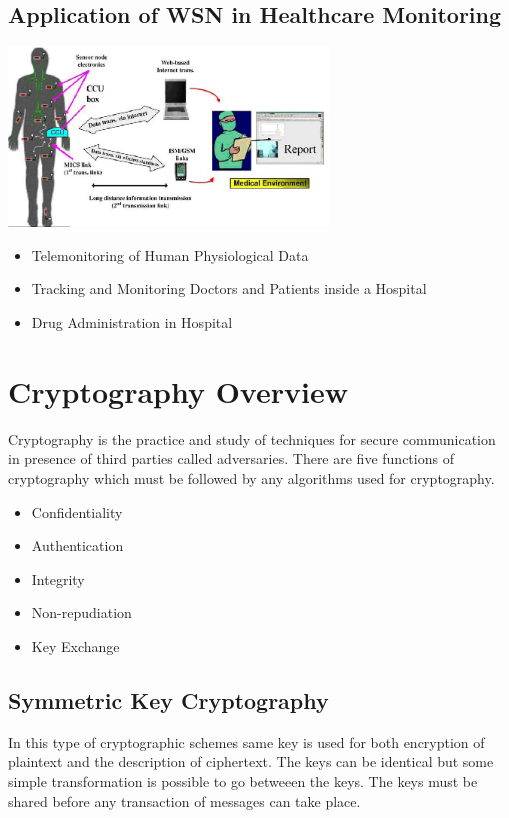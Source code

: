 \documentclass[conference]{IEEEtran}
\begin{document}
\subsection{Application of WSN in Healthcare Monitoring}
\includegraphics[width=8.5cm]{WSN}
\linebreak
\begin{itemize}
  \item Telemonitoring of Human Physiological Data
  \item Tracking and Monitoring Doctors and Patients inside a Hospital
  \item Drug Administration in Hospital
\end{itemize}

\section{Cryptography Overview}
Cryptography is the practice and study of techniques for secure communication in presence of third parties called adversaries.
\linebreak
There are five functions of cryptography which must be followed by any algorithms used for cryptography.
\begin{itemize}
  \item Confidentiality
  \item Authentication
  \item Integrity
  \item Non-repudiation
  \item Key Exchange
\end{itemize}

\subsection{Symmetric Key Cryptography}
In this type of cryptographic schemes same key is used for both encryption of plaintext and the description of ciphertext. The keys can be identical but some simple transformation is possible to go betweeen the keys. The keys must be shared before any transaction of messages can take place.
\linebreak
\end{document}
